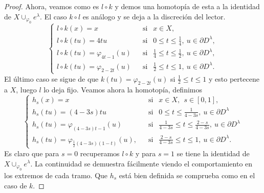 \begin{proof}
    Ahora, veamos como es $l\circ k$ y demos una homotopía de esta a la identidad de $X\cup_{\varphi_0} e^{\lambda}$. El caso $k\circ l$ es análogo y se deja a la discreción del lector.
    \begin{equation*}
        \begin{cases}
            l\circ k(x) = x &~~\text{ si }~~ x\in X,\\
            l\circ k(tu) = 4tu &~~\text{ si }~~ 0\le t\le \frac{1}{4},~u\in \partial D^{\lambda},\\
            l\circ k(tu) = \varphi_{4t-1}(u) &~~\text{ si }~~  \frac{1}{4} \le t\le \frac{1}{2},~u\in \partial D^{\lambda},\\
            l\circ k(tu) = \varphi_{2-2t}(u) &~~\text{ si }~~  \frac{1}{2} \le t\le 1,~u\in \partial D^{\lambda}.
        \end{cases}
    \end{equation*}
    El último caso se sigue de que $k(tu) = \varphi_{2-2t}(u)$ si $\frac{1}{2} \le t\le 1$ y esto pertecene a $X$, luego $l$ lo deja fijo. Veamos ahora la homotopía, definimos
    \begin{equation*}
    \begin{cases}
        h_s(x) = x &~~\text{ si }~~ x\in X, ~~s\in[0,1],\\[4pt]
        h_s(tu) = (4-3s)tu &~~\text{ si }~~ 0 \le t \le \frac{1}{4-3s},~u\in \partial D^{\lambda} \\[4pt]
        h_s(tu) = \varphi_{(4-3s)t-1}(u) &~~\text{ si }~~ \frac{1}{4-3s} \le t \le \frac{2-s}{4-3s},~u\in \partial D^{\lambda} \\[4pt]
        h_s(tu) = \varphi_{\frac{1}{2}(4-3s)(1-t)}(u),
        &~~\text{ si }~~  \frac{2-s}{4-3s} \le t \le 1,~u\in \partial D^{\lambda}.
    \end{cases}
    \end{equation*}
    Es claro que para $s=0$ recuperamos $l\circ k$ y para $s=1$ se tiene la identidad de $X\cup_{\varphi_0} e^{\lambda}$. La continuidad se demuestra fácilmente viendo el comportamiento en los extremos de cada tramo. Que $h_s$ está bien definida se comprueba como en el caso de $k$.

\end{proof}
\bigskip

